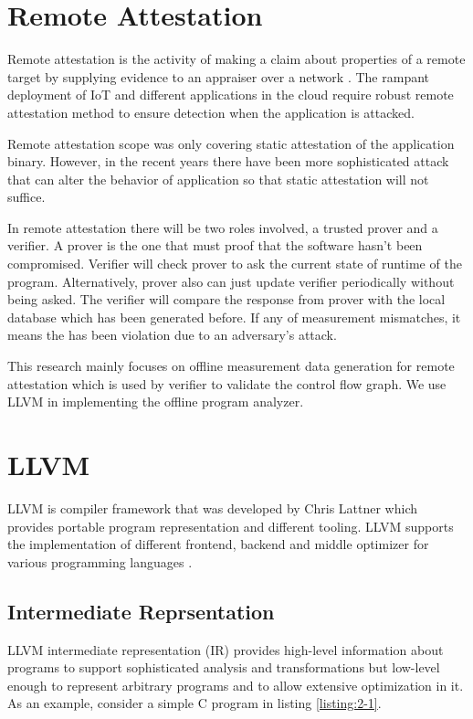 
\section{Remote Attestation}
Remote attestation is the activity of making a claim about properties of a remote target by supplying evidence to an appraiser over a network \cite{cokerPrinciplesRemoteAttestation2011a}. The rampant deployment of IoT and different applications in the cloud require robust remote attestation method to ensure detection when the application is attacked.

Remote attestation scope was only covering static attestation of the application binary. However, in the recent years there have been more sophisticated attack that can alter the behavior of application so that static attestation will not suffice. 

In remote attestation there will be two roles involved, a trusted prover and a verifier. A prover is the one that must proof that the software hasn't been compromised. Verifier will check prover to ask the current state of runtime of the program. Alternatively, prover also can just update verifier periodically without being asked. The verifier will compare the response from prover with the local database which has been generated before. If any of measurement mismatches, it means the has been violation due to an adversary's attack.

This research mainly focuses on offline measurement data generation for remote attestation which is used by verifier to validate the control flow graph. We use LLVM in implementing the offline program analyzer.

\section{LLVM}

LLVM is compiler framework that was developed by Chris Lattner which provides portable program representation and different tooling. LLVM supports the implementation of different frontend, backend and middle optimizer for various programming languages \cite{lattnerLLVMCompilationFramework2004a}. 

\subsection{Intermediate Reprsentation}

LLVM intermediate representation (IR) provides high-level information about programs to support sophisticated analysis and transformations but low-level enough to represent arbitrary programs and to allow extensive optimization in it. As an example, consider a simple C program in listing \ref{listing:2-1}.

